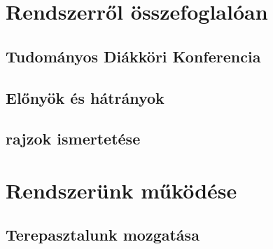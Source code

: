 \documentclass[
]{thesis-ekf}
\theoremstyle{definition}
\theoremstyle{remark}
\begin{document}
		
\chapter{Rendszerről összefoglalóan}
	\section{Tudományos Diákköri Konferencia}
	
	\section{Előnyök és hátrányok}
		
	\section{rajzok ismertetése}

\chapter{Rendszerünk működése}
	\section{Terepasztalunk mozgatása}
\end{document}

